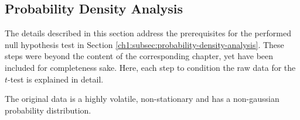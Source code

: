\subsection{Probability Density Analysis}

The details described in this section address the prerequisites for the performed null hypothesis test in Section \ref{ch1:subsec:probability-density-analysis}.
These steps were beyond the content of the corresponding chapter, yet have been included for completeness sake.
Here, each step to condition the raw data for the $t$-test is explained in detail.

The original data is a highly volatile, non-stationary and has a non-gaussian probability distribution.
